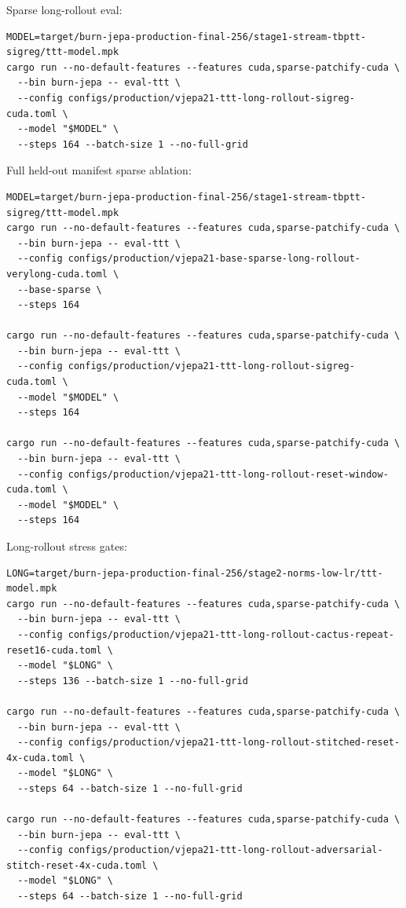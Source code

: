 \documentclass[10pt]{article}
\begin{document}
Sparse long-rollout eval:
\begin{verbatim}
MODEL=target/burn-jepa-production-final-256/stage1-stream-tbptt-sigreg/ttt-model.mpk
cargo run --no-default-features --features cuda,sparse-patchify-cuda \
  --bin burn-jepa -- eval-ttt \
  --config configs/production/vjepa21-ttt-long-rollout-sigreg-cuda.toml \
  --model "$MODEL" \
  --steps 164 --batch-size 1 --no-full-grid
\end{verbatim}

Full held-out manifest sparse ablation:
\begin{verbatim}
MODEL=target/burn-jepa-production-final-256/stage1-stream-tbptt-sigreg/ttt-model.mpk
cargo run --no-default-features --features cuda,sparse-patchify-cuda \
  --bin burn-jepa -- eval-ttt \
  --config configs/production/vjepa21-base-sparse-long-rollout-verylong-cuda.toml \
  --base-sparse \
  --steps 164

cargo run --no-default-features --features cuda,sparse-patchify-cuda \
  --bin burn-jepa -- eval-ttt \
  --config configs/production/vjepa21-ttt-long-rollout-sigreg-cuda.toml \
  --model "$MODEL" \
  --steps 164

cargo run --no-default-features --features cuda,sparse-patchify-cuda \
  --bin burn-jepa -- eval-ttt \
  --config configs/production/vjepa21-ttt-long-rollout-reset-window-cuda.toml \
  --model "$MODEL" \
  --steps 164
\end{verbatim}

Long-rollout stress gates:
\begin{verbatim}
LONG=target/burn-jepa-production-final-256/stage2-norms-low-lr/ttt-model.mpk
cargo run --no-default-features --features cuda,sparse-patchify-cuda \
  --bin burn-jepa -- eval-ttt \
  --config configs/production/vjepa21-ttt-long-rollout-cactus-repeat-reset16-cuda.toml \
  --model "$LONG" \
  --steps 136 --batch-size 1 --no-full-grid

cargo run --no-default-features --features cuda,sparse-patchify-cuda \
  --bin burn-jepa -- eval-ttt \
  --config configs/production/vjepa21-ttt-long-rollout-stitched-reset-4x-cuda.toml \
  --model "$LONG" \
  --steps 64 --batch-size 1 --no-full-grid

cargo run --no-default-features --features cuda,sparse-patchify-cuda \
  --bin burn-jepa -- eval-ttt \
  --config configs/production/vjepa21-ttt-long-rollout-adversarial-stitch-reset-4x-cuda.toml \
  --model "$LONG" \
  --steps 64 --batch-size 1 --no-full-grid
\end{verbatim}
\end{document}
